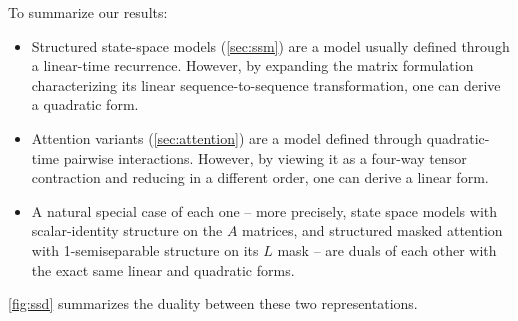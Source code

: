 \documentclass{article}
\begin{document}
To summarize our results:
\begin{itemize}
  \item Structured state-space models (\cref{sec:ssm}) are a model usually defined through a linear-time recurrence.
    However, by expanding the matrix formulation characterizing its linear sequence-to-sequence transformation, one can derive a quadratic form.
  \item Attention variants (\cref{sec:attention}) are a model defined through quadratic-time pairwise interactions. However, by viewing it as a four-way tensor contraction and reducing in a different order, one can derive a linear form.
  \item A natural special case of each one -- 
    more precisely, state space models with scalar-identity structure on the $A$ matrices, and structured masked attention with 1-semiseparable structure on its $L$ mask
    -- are duals of each other with the exact same linear and quadratic forms.
\end{itemize}
\cref{fig:ssd} summarizes the duality between these two representations.
\end{document}
